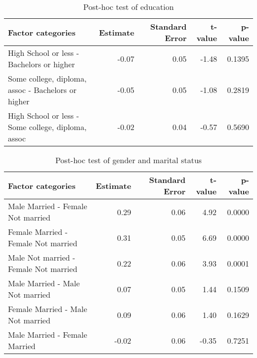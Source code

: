 \documentclass[11pt]{extarticle} %
\begin{document}
\begin{table}[H]
\footnotesize
\centering
\begin{tabular}{lrrrr}
  \hline
  Factor categories & Estimate & Standard Error & t-value & p-value \\ 
  \hline
   High School or less - Bachelors or higher & -0.07 & 0.05 & -1.48 & 0.1395 \\ 
   Some college, diploma, assoc - Bachelors or higher & -0.05 & 0.05 & -1.08 & 0.2819 \\ 
   High School or less - Some college, diploma, assoc & -0.02 & 0.04 & -0.57 & 0.5690 \\ 
  \hline
\end{tabular}
\caption{Post-hoc test of education} 
\label{tab:DisabEducation}
\end{table}

\begin{table}[H]
\footnotesize
\centering
\begin{tabular}{lrrrr}
  \hline
  Factor categories & Estimate & Standard Error & t-value & p-value \\ 
  \hline
    Male Married -  Female Not married & 0.29 & 0.06 & 4.92 & 0.0000 \\ 
    Female Married -  Female Not married & 0.31 & 0.05 & 6.69 & 0.0000 \\ 
    Male Not married -  Female Not married & 0.22 & 0.06 & 3.93 & 0.0001 \\ 
    Male Married -  Male Not married & 0.07 & 0.05 & 1.44 & 0.1509 \\ 
    Female Married -  Male Not married & 0.09 & 0.06 & 1.40 & 0.1629 \\ 
    Male Married -  Female Married & -0.02 & 0.06 & -0.35 & 0.7251 \\ 
  \hline
\end{tabular}
\caption{Post-hoc test of gender and marital status} 
\label{tab:DisabGenderMS}
\end{table}
\end{document}
